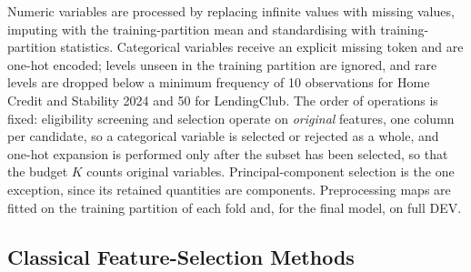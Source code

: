 \documentclass[final,5p,twocolumn]{elsarticle}
\newcommand{\Kfeat}{K}
\begin{document}
Numeric variables are processed by replacing infinite values with missing values, imputing with the training-partition mean and standardising with training-partition statistics. Categorical variables receive an explicit missing token and are one-hot encoded; levels unseen in the training partition are ignored, and rare levels are dropped below a minimum frequency of 10 observations for Home Credit and Stability 2024 and 50 for LendingClub. The order of operations is fixed: eligibility screening and selection operate on \emph{original} features, one column per candidate, so a categorical variable is selected or rejected as a whole, and one-hot expansion is performed only after the subset has been selected, so that the budget $\Kfeat$ counts original variables. Principal-component selection is the one exception, since its retained quantities are components. Preprocessing maps are fitted on the training partition of each fold and, for the final model, on full DEV.

\subsection{Classical Feature-Selection Methods}
\label{subsec:classical_fs}
\end{document}
